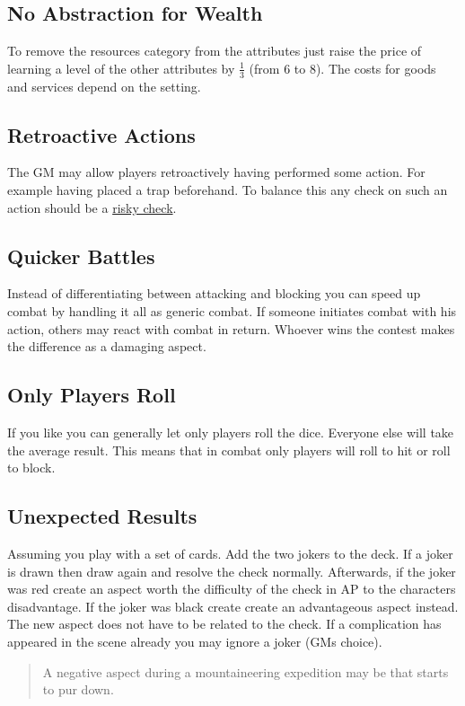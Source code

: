 \documentclass[11pt]{article}
\begin{document}
{\subsection{No Abstraction for Wealth}
\label{sec:org7461cb0}

To remove the resources category from the attributes just raise the price of learning a level of the other attributes by \(\frac{1}{3}\) (from 6 to 8). The costs for goods and services
depend on the setting.
\subsection{Retroactive Actions}
\label{sec:orgbb5f937}

The GM may allow players retroactively having performed some action. For example having placed a trap beforehand. To balance this any check on such an action should be a \hyperref[sec:orgdb86fca]{risky check}.
\subsection{Quicker Battles}
\label{sec:org33aa28a}

Instead of differentiating between attacking and blocking you can speed up combat by handling it all as generic combat. If someone initiates combat with his action, others may react with combat in return. Whoever wins the contest makes the difference as a damaging aspect.
\subsection{Only Players Roll}
\label{sec:org22814a7}
If you like you can generally let only players roll the dice. Everyone else will take the average result. This means that in combat only players will roll to hit or roll to block.
\subsection{Unexpected Results}
\label{sec:org1508085}
Assuming you play with a set of cards. Add the two jokers to the deck. If a joker is drawn then draw again and resolve the check normally. Afterwards, if the joker was red create an aspect worth the difficulty of the check in AP to the characters disadvantage. If the joker was black create create an advantageous aspect instead. The new aspect does not have to be related to the check.
If a complication has appeared in the scene already you may ignore a joker (GMs choice).

\begin{quote}
A negative aspect during a mountaineering expedition may be that  starts to pur down.
\end{quote}

}
\end{document}
